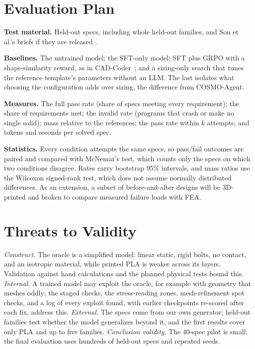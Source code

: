 \documentclass[conference]{IEEEtran}
\begin{document}
\section{Evaluation Plan}

\textbf{Test material.} Held-out specs, including whole held-out families, and Son et al.'s briefs if
they are released~\cite{son2026selfimproving}.

\textbf{Baselines.} The untrained model; the SFT-only model; SFT plus GRPO with a shape-similarity
reward, as in CAD-Coder~\cite{guan2025cadcoder}; and a sizing-only search that tunes the reference
template's parameters without an LLM. The last isolates what choosing the configuration adds over
sizing, the difference from COSMO-Agent.

\textbf{Measures.} The full pass rate (share of specs meeting every requirement); the share of
requirements met; the invalid rate (programs that crash or make no single solid); mass relative to the
references; the pass rate within $k$ attempts; and tokens and seconds per solved spec.

\textbf{Statistics.} Every condition attempts the same specs, so pass/fail outcomes are paired and
compared with McNemar's test, which counts only the specs on which two conditions disagree. Rates carry
bootstrap 95\% intervals, and mass ratios use the Wilcoxon signed-rank test, which does not assume
normally distributed differences. As an extension, a subset of before-and-after designs will be
3D-printed and broken to compare measured failure loads with FEA.

\section{Threats to Validity}

\textit{Construct.} The oracle is a simplified model: linear static, rigid bolts, no contact, and an
isotropic material, while printed PLA is weaker across its layers. Validation against hand
calculations and the planned physical tests bound this. \textit{Internal.} A trained model may exploit
the oracle, for example with geometry that meshes oddly; the staged checks, the stress-reading zones,
mesh-refinement spot checks, and a log of every exploit found, with earlier checkpoints re-scored after
each fix, address this. \textit{External.} The specs
come from our own generator; held-out families test whether the model generalizes beyond it, and the
first results cover only PLA and up to five families. \textit{Conclusion validity.} The 40-spec pilot is small;
the final evaluation uses hundreds of held-out specs and repeated seeds.
\end{document}
